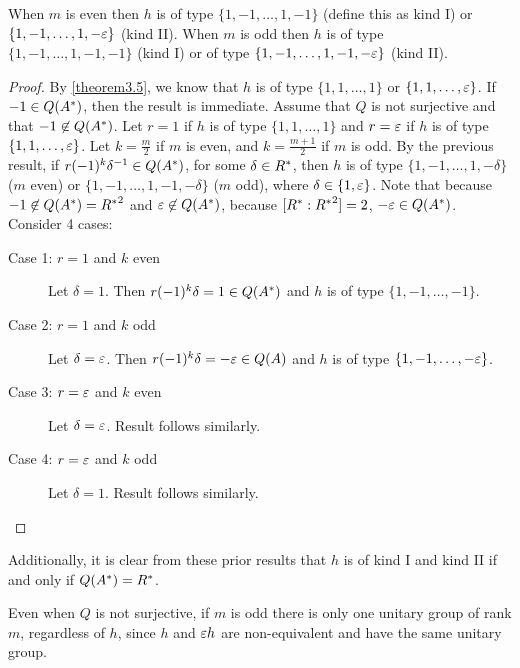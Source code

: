 \begin{lemma}\label{extralemma2}
When $m$ is even then $h$ is of type $\{1, -1, \dotsc, 1, -1 \}$ (define this as kind I) or $\{1, -1,\dotsc, 1, -\varepsilon \}$ (kind II).
When $m$ is odd then $h$ is of type $\{1, -1, \dotsc, 1, -1, -1 \}$ (kind I) or of type $\{1, -1, \dotsc, 1, -1, -\varepsilon \}$ (kind II).
\end{lemma}

\begin{proof}
By \cref{theorem3.5}, we know that $h$ is of type $\{1, 1, \dotsc, 1\}$ or $\{1, 1, \dotsc, \varepsilon \}$.
If $-1 \in Q(A^*)$, then the result is immediate.
Assume that $Q$ is not surjective and that $-1 \not\in Q(A^*)$.
Let $r = 1$ if $h$ is of type $\{1, 1, \dotsc, 1\}$ and $r = \varepsilon$ if $h$ is of type $\{1, 1, \dotsc, \varepsilon\}$.
Let $k = \frac{m}{2}$ if $m$ is even, and $k = \frac{m+1}{2}$ if $m$ is odd.
By the previous result, if $r (-1)^k \delta ^{-1} \in Q(A^*)$, for some $\delta \in R^*$, then $h$ is of type $\{1, -1, \dotsc, 1, -\delta\}$ ($m$ even) or $\{1, -1, \dotsc, 1, -1, -\delta \}$ ($m$ odd), where $\delta \in \{1, \varepsilon\}$.
Note that because $-1 \not\in Q(A^*) = {R^*}^2$ and $\varepsilon \not \in Q(A^*)$, because $[R^* : {R^*}^2] = 2$, $-\varepsilon \in Q(A^*)$.
Consider 4 cases:
\begin{description}
\item[Case 1: $r = 1$ and $k$ even] Let $\delta = 1$. Then $r (-1)^k \delta = 1 \in Q(A^*)$ and $h$ is of type $\{1, -1, \dotsc, -1 \}$.
\item[Case 2: $r = 1$ and $k$ odd] Let $\delta = \varepsilon$. Then $r (-1)^k \delta = -\varepsilon \in Q(A)$ and $h$ is of type $\{1, -1, \dotsc, -\varepsilon \}$.
\item[Case 3: $r = \varepsilon$ and $k$ even] Let $\delta = \varepsilon$. Result follows similarly.
\item[Case 4: $r = \varepsilon$ and $k$ odd] Let $\delta = 1$. Result follows similarly.
\end{description}
\end{proof}
Additionally, it is clear from these prior results that $h$ is of kind I and kind II if and only if $Q(A^*) = R^*$.

Even when $Q$ is not surjective, if $m$ is odd there is only one unitary group of rank $m$, regardless of $h$, since $h$ and $\varepsilon h$ are non-equivalent and have the same unitary group.

